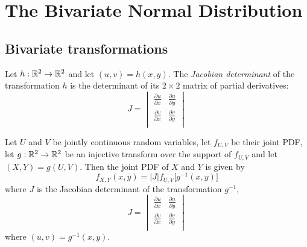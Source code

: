 
\chapter{The Bivariate Normal Distribution}


\section{Bivariate transformations}

\begin{definition}\label{def:jacobian}
Let $h:\mathbb{R}^2\to\mathbb{R}^2$ and let $(u,v) = h(x,y)$. The \emph{Jacobian determinant} of the transformation $h$ is the determinant of its $2\times 2$ matrix of partial derivatives:
\[
J = \begin{vmatrix}
\displaystyle\frac{\partial u}{\partial x} & \displaystyle\frac{\partial u}{\partial y} \\[2ex]
\displaystyle\frac{\partial v}{\partial x} & \displaystyle\frac{\partial v}{\partial y} \\[2ex]
\end{vmatrix}
\]
\end{definition}

\begin{theorem}\label{thm:bivariate_transformation_pdf}
Let $U$ and $V$ be jointly continuous random variables, let $f_{U,V}$ be their joint PDF, let $g:\mathbb{R}^2\to\mathbb{R}^2$ be an injective transform over the support of $f_{U,V}$ and let $(X,Y) = g(U,V)$. Then the joint PDF of $X$ and $Y$ is given by
\[
f_{X,Y}(x,y) = |J| f_{U,V}\big[ g^{-1}(x,y) \big]
\] 
where $J$ is the Jacobian determinant of the transformation $g^{-1}$,
\[
J = 
\begin{vmatrix}
\displaystyle\frac{\partial u}{\partial x} & \displaystyle\frac{\partial u}{\partial y} \\[2ex]
\displaystyle\frac{\partial v}{\partial x} & \displaystyle\frac{\partial v}{\partial y} \\[2ex]
\end{vmatrix}
\]
where $(u,v) = g^{-1}(x,y)$.
\end{theorem}

